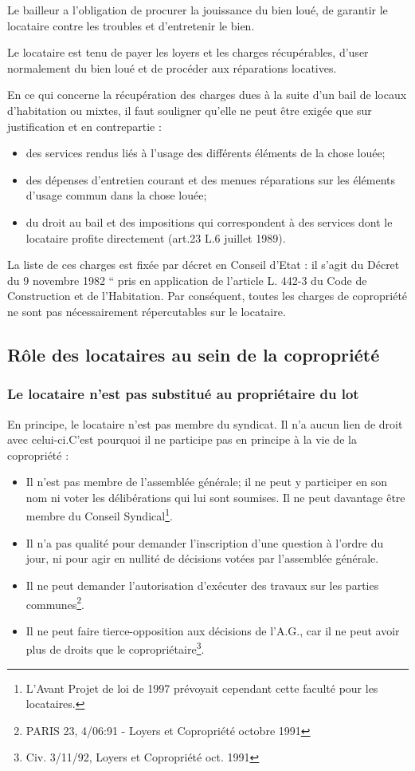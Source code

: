 		Le bailleur a l'obligation de procurer la jouissance du bien loué, de garantir le locataire contre les troubles et d'entretenir le bien.
		
		Le locataire est tenu de payer les loyers et les charges récupérables, d'user normalement du bien loué et de procéder aux réparations locatives.
		
		En ce qui concerne la récupération des charges dues à la suite d'un bail de locaux d'habitation ou mixtes, il faut souligner qu'elle ne peut être exigée que sur justification et en contrepartie :
		\begin{itemize}
			\item des services rendus liés à l'usage des différents éléments de la chose louée;
			\item des dépenses d'entretien courant et des menues réparations sur les éléments d'usage commun dans la chose louée;
			\item du droit au bail et des impositions qui correspondent à des services dont le locataire profite directement (art.23 L.6 juillet 1989).
		\end{itemize}
		La liste de ces charges est fixée par décret en Conseil d'Etat : il s’agit du Décret du 9 novembre 1982 “ pris en application de l’article L. 442-3 du Code de Construction et de l’Habitation. Par conséquent, toutes les charges de copropriété ne sont pas nécessairement répercutables sur le locataire.
	
	\subsection{Rôle des locataires au sein de la copropriété}

		\subsubsection{Le locataire n’est pas substitué au propriétaire du lot}
		
			En principe, le locataire n'est pas membre du syndicat. Il n'a aucun lien de droit avec celui-ci.C'est pourquoi il ne participe pas en principe à la vie de la copropriété :
			\begin{itemize}
				\item Il n'est pas membre de l'assemblée générale; il ne peut y participer en son nom ni voter les délibérations qui lui sont soumises. Il ne peut davantage être membre du Conseil Syndical\footnote{ L’Avant Projet de loi de 1997 prévoyait cependant cette faculté pour les locataires.}.
				\item Il n'a pas qualité pour demander l'inscription d'une question à l'ordre du jour, ni pour agir en nullité de décisions votées par l'assemblée générale.
				\item Il ne peut demander l'autorisation d'exécuter des travaux sur les parties communes\footnote{PARIS 23\degres, 4/06:91 - Loyers et Copropriété octobre 1991}.
				\item Il ne peut faire tierce-opposition aux décisions de l’A.G., car il ne peut avoir plus de droits que le copropriétaire\footnote{Civ. 3/11/92, Loyers et Copropriété oct. 1991}.
			\end{itemize}
		
